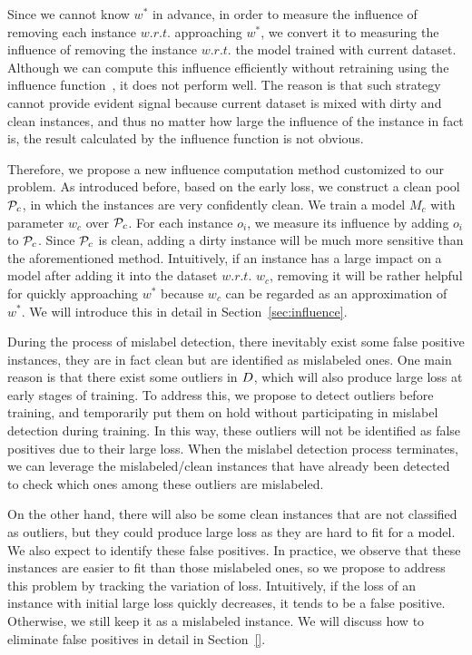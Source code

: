 Since we cannot know  $w^*$ in advance, in order to measure the influence of removing each instance $w.r.t.$ approaching  $w^*$, we  convert it to  measuring the influence of removing the instance $w.r.t.$ the model trained with current dataset. Although we can compute this influence efficiently without retraining using the influence function~\cite{}, it does not perform well. The reason is that  such strategy cannot provide evident signal because current dataset is mixed with dirty and clean instances, and thus no matter how large the influence of the instance in fact is, the  result  calculated by the influence function is not obvious.

Therefore, we propose a new influence computation method customized to our problem. As introduced before, based on the early loss,  we construct a clean pool $\mathcal{P}_c$, in which the instances are very confidently clean. We train a model $M_c$ with parameter $w_c$ over $\mathcal{P}_c$. For each instance $o_i$, we measure its influence by adding $o_i$ to $\mathcal{P}_c$. Since $\mathcal{P}_c$ is clean, adding a dirty instance will be much more sensitive than the aforementioned method.
Intuitively, if an instance has a large impact on a model after adding it into the dataset  $w.r.t.$  $w_c$, removing it will be rather helpful  for   quickly  approaching $w^*$ because $w_c$ can be regarded as an approximation of $w^*$. We will introduce this in detail in Section~\ref{sec:influence}.




 During the process of mislabel detection, there inevitably exist some false positive instances, \ie  they are in fact clean but are identified as mislabeled ones. One main reason is that there exist some outliers in $D$, which will also produce large loss at early stages of training. To address this, we propose to detect outliers before training, and temporarily put them on hold without participating in mislabel detection during training. In this way, these outliers will not be identified as false positives due to their large loss. When the mislabel detection process terminates, we can leverage the mislabeled/clean instances that have already been detected to check which ones among these outliers are mislabeled.

On the other hand, there will also be some clean instances that are not classified as outliers, but they could produce large loss as they are hard to fit for a model. We also expect to identify these false positives. In practice, we observe that these instances are easier to fit than those mislabeled ones, so we propose to address this problem by tracking the variation of loss. Intuitively, if the loss  of an instance with initial large loss quickly decreases, it tends to be a false positive. Otherwise, we still keep it as a mislabeled instance. We will discuss how to eliminate false positives in detail in Section~\ref{}.


